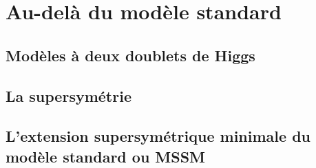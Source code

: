 \section{Au-delà du modèle standard}\label{chapter-MS-MSSM-section-BSM}
\subsection{Modèles à deux doublets de Higgs}\label{chapter-MS-MSSM-section-BSM-subsec-dbl_H_dbl}
\subsection{La supersymétrie}\label{chapter-MS-MSSM-section-BSM-subsec-SUSY}
\subsection{L'extension supersymétrique minimale du modèle standard ou MSSM}\label{chapter-MS-MSSM-section-BSM-subsec-MSSM}
